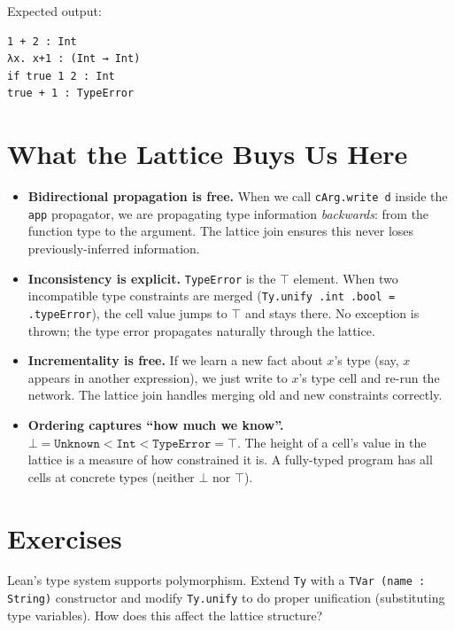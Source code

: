 \documentclass[12pt, a4paper, openright]{book}
\theoremstyle{thmstyle}
\theoremstyle{defstyle}
\newcommand{\lc}[1]{\texttt{#1}}
\newcounter{exercise}[chapter]
\newenvironment{exercisebox}[1][]{%
  \refstepcounter{exercise}%
  \begin{tcolorbox}[exercisebox,
    title={Exercise \thechapter.\theexercise\ifx\\#1\\\else\ --- #1\fi}]%
}{\end{tcolorbox}}
\begin{document}
Expected output:
\begin{verbatim}
1 + 2 : Int
λx. x+1 : (Int → Int)
if true 1 2 : Int
true + 1 : TypeError
\end{verbatim}

\section{What the Lattice Buys Us Here}

\begin{itemize}
  \item \textbf{Bidirectional propagation is free.}
    When we call \lc{cArg.write d} inside the \lc{app} propagator, we are
    propagating type information \emph{backwards}: from the function type to
    the argument. The lattice join ensures this never loses previously-inferred
    information.

  \item \textbf{Inconsistency is explicit.}
    \lc{TypeError} is the $\top$ element. When two incompatible type
    constraints are merged (\lc{Ty.unify .int .bool = .typeError}), the cell
    value jumps to $\top$ and stays there. No exception is thrown; the type
    error propagates naturally through the lattice.

  \item \textbf{Incrementality is free.}
    If we learn a new fact about $x$'s type (say, $x$ appears in another
    expression), we just write to $x$'s type cell and re-run the network.
    The lattice join handles merging old and new constraints correctly.

  \item \textbf{Ordering captures ``how much we know''.}
    $\bot = \texttt{Unknown} < \texttt{Int} < \texttt{TypeError} = \top$.
    The height of a cell's value in the lattice is a measure of how constrained
    it is. A fully-typed program has all cells at concrete types (neither
    $\bot$ nor $\top$).
\end{itemize}

\section{Exercises}

\begin{exercisebox}[Let-polymorphism]
  Lean's type system supports polymorphism. Extend \lc{Ty} with a
  \lc{TVar (name : String)} constructor and modify \lc{Ty.unify} to
  do proper unification (substituting type variables).
  How does this affect the lattice structure?
\end{exercisebox}
\end{document}
